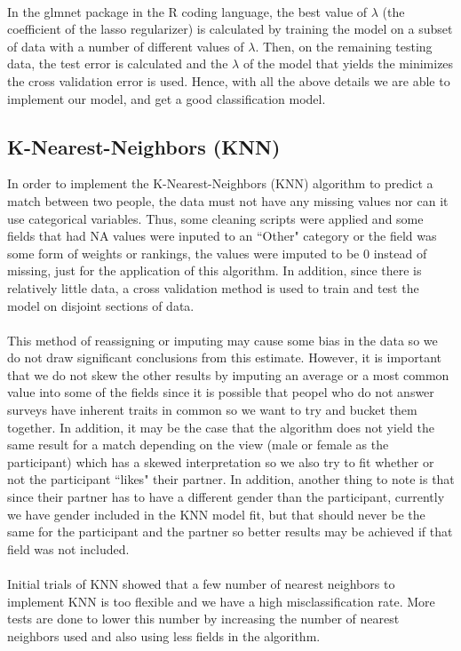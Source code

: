 \documentclass{article}
\begin{document}
\null\\
In the glmnet package in the R coding language, the best value of $\lambda$ (the coefficient of the lasso regularizer) is calculated by training the model on a subset of data with a number of different values of $\lambda$.  Then, on the remaining testing data, the test error is calculated and the $\lambda$ of the model that yields the minimizes the cross validation error is used. Hence, with all the above details we are able to implement our model, and get a good classification model.
%
\subsection{K-Nearest-Neighbors (KNN)}
In order to implement the K-Nearest-Neighbors (KNN) algorithm to predict a match between two people, the data must not have any missing values nor can it use categorical variables.  Thus, some cleaning scripts were applied and some fields that had NA values were inputed to an ``Other" category or the field was some form of weights or rankings, the values were imputed to be 0 instead of missing, just for the application of this algorithm.  In addition, since there is relatively little data, a cross validation method is used to train and test the model on disjoint sections of data.\\
\null\\
This method of reassigning or imputing may cause some bias in the data so we do not draw significant conclusions from this estimate.  However, it is important that we do not skew the other results by imputing an average or a most common value into some of the fields since it is possible that peopel who do not answer surveys have inherent traits in common so we want to try and bucket them together.  In addition, it may be the case that the algorithm does not yield the same result for a match depending on the view (male or female as the participant) which has a skewed interpretation so we also try to fit whether or not the participant ``likes" their partner.  In addition, another thing to note is that since their partner has to have a different gender than the participant, currently we have gender included in the KNN model fit, but that should never be the same for the participant and the partner so better results may be achieved if that field was not included.\\
\null\\
Initial trials of KNN showed that a few number of nearest neighbors to implement KNN is too flexible and we have a high misclassification rate.  More tests are done to lower this number by increasing the number of nearest neighbors used and also using less fields in the algorithm.
%
\end{document}
